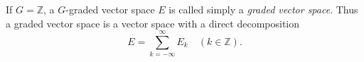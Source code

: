 If $G = \mathbb{Z}$, a $G$-graded vector space $E$ is called simply a \textit{graded vector space}. Thus a graded vector space is a vector space with a direct decomposition
$$E = \sum_{k=-\infty}^{\infty} E_k \quad (k \in \mathbb{Z}).$$
